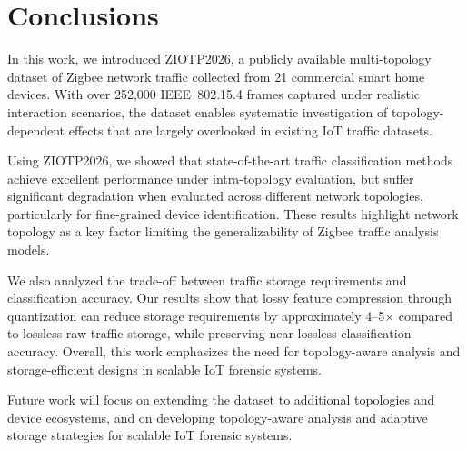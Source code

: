 \section{Conclusions}
\label{sec:conclusion}
In this work, we introduced ZIOTP2026, a publicly available multi-topology dataset of Zigbee network traffic collected from 21 commercial smart home devices. With over 252,000 IEEE~802.15.4 frames captured under realistic interaction scenarios, the dataset enables systematic investigation of topology-dependent effects that are largely overlooked in existing IoT traffic datasets.

Using ZIOTP2026, we showed that state-of-the-art traffic classification methods achieve excellent performance under intra-topology evaluation, but suffer significant degradation when evaluated across different network topologies, particularly for fine-grained device identification. These results highlight network topology as a key factor limiting the generalizability of Zigbee traffic analysis models.

We also analyzed the trade-off between traffic storage requirements and classification accuracy. Our results show that lossy feature compression through quantization can reduce storage requirements by approximately 4--5$\times$ compared to lossless raw traffic storage, while preserving near-lossless classification accuracy. Overall, this work emphasizes the need for topology-aware analysis and storage-efficient designs in scalable IoT forensic systems.

Future work will focus on extending the dataset to additional topologies and device ecosystems, and on developing topology-aware analysis and adaptive storage strategies for scalable IoT forensic systems.